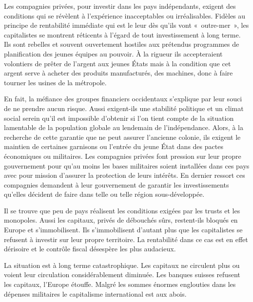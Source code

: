 \documentclass[french,twoside]{book} %
\begin{document}
Les compagnies privées, pour investir dans les pays indépendants, exigent des conditions qui se révèlent à l’expérience   inacceptables ou irréalisables. Fidèles au principe de rentabilité immédiate qui est le leur dès qu’ils vont « outre-mer », les capitalistes se montrent réticents à l’égard de tout investissement à long terme. Ils sont rebelles et souvent ouvertement hostiles aux prétendus programmes de planification des jeunes équipes au pouvoir. À la rigueur ils accepteraient volontiers de prêter de l’argent aux jeunes États mais à la condition que cet argent serve à acheter des produits manufacturés, des machines, donc à faire tourner les usines de la métropole.\par
En fait, la méfiance des groupes financiers occidentaux s’explique par leur souci de ne prendre aucun risque. Aussi exigent-ils une stabilité politique et un climat social serein qu’il est impossible d’obtenir si l’on tient compte de la situation lamentable de la population globale au lendemain de l’indépendance. Alors, à la recherche de cette garantie que ne peut assurer l’ancienne colonie, ils exigent le maintien de certaines garnisons ou l’entrée du jeune État dans des pactes économiques ou militaires. Les compagnies privées font pression sur leur propre gouvernement pour qu’au moins les bases militaires soient installées dans ces pays avec pour mission d’assurer la protection de leurs intérêts. En dernier ressort ces compagnies demandent à leur gouvernement de garantir les investissements qu’elles décident de faire dans telle ou telle région sous-développée.\par
Il se trouve que peu de pays réalisent les conditions exigées par les trusts et les monopoles. Aussi les capitaux, privés de débouchés sûrs, restent-ils bloqués en Europe et s’immobilisent. Ils s’immobilisent d’autant plus que les capitalistes se refusent à investir sur leur propre territoire. La rentabilité dans ce cas est en effet dérisoire et le contrôle fiscal désespère les plus audacieux.\par
La situation est à long terme catastrophique. Les capitaux ne circulent plus ou voient leur circulation considérablement diminuée. Les banques suisses refusent les capitaux, l’Europe étouffe. Malgré les sommes énormes englouties dans les dépenses militaires le capitalisme international est aux abois.\par
\end{document}
